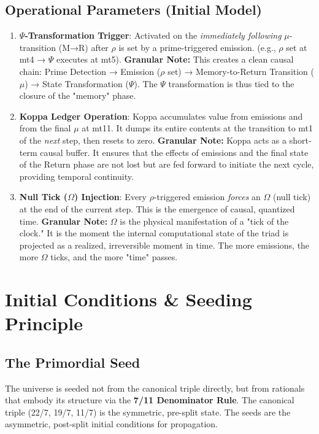 \documentclass[12pt]{article}
\begin{document}
\subsection{Operational Parameters (Initial Model)}
\begin{enumerate}
    \item \textbf{$\Psi$-Transformation Trigger}: Activated on the \textit{immediately following} $\mu$-transition (M→R) after $\rho$ is set by a prime-triggered emission. (e.g., $\rho$ set at mt4 → $\Psi$ executes at mt5).
    \textbf{Granular Note:} This creates a clean causal chain: Prime Detection → Emission ($\rho$ set) → Memory-to-Return Transition ($\mu$) → State Transformation ($\Psi$). The $\Psi$ transformation is thus tied to the closure of the "memory" phase.
    \item \textbf{Koppa Ledger Operation}: Koppa accumulates value from emissions and from the final $\mu$ at mt11. It dumps its entire contents at the transition to mt1 of the \textit{next} step, then resets to zero.
    \textbf{Granular Note:} Koppa acts as a short-term causal buffer. It ensures that the effects of emissions and the final state of the Return phase are not lost but are fed forward to initiate the next cycle, providing temporal continuity.
    \item \textbf{Null Tick ($\Omega$) Injection}: Every $\rho$-triggered emission \textit{forces} an $\Omega$ (null tick) at the end of the current step. This is the emergence of causal, quantized time.
    \textbf{Granular Note:} $\Omega$ is the physical manifestation of a "tick of the clock." It is the moment the internal computational state of the triad is projected as a realized, irreversible moment in time. The more emissions, the more $\Omega$ ticks, and the more "time" passes.
\end{enumerate}

\section{Initial Conditions \& Seeding Principle}

\subsection{The Primordial Seed}
The universe is seeded not from the canonical triple directly, but from rationals that embody its structure via the \textbf{7/11 Denominator Rule}. The canonical triple (22/7, 19/7, 11/7) is the symmetric, pre-split state. The seeds are the asymmetric, post-split initial conditions for propagation.
\end{document}
